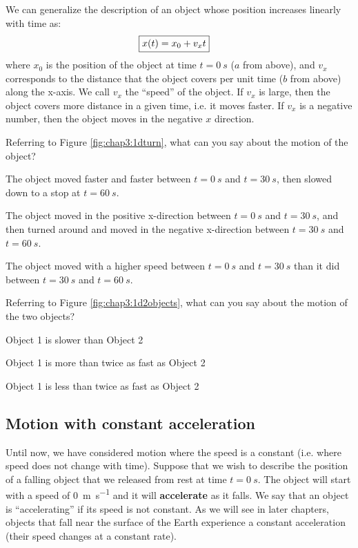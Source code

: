 We can generalize the description of an object whose position increases linearly with time as:
\begin{align}
\label{eqn:chap3:1dxvst_noa}
\Aboxed{x(t) = x_0 + v_xt}
\end{align}
where $x_0$ is the position of the object at time $t=\SI{0}{s}$ ($a$ from above), and $v_x$ corresponds to the distance that the object covers per unit time ($b$ from above) along the x-axis. We call $v_x$ the ``speed'' of the object. If $v_x$ is large, then the object covers more distance in a given time, i.e. it moves faster. If $v_x$ is a negative number, then the object moves in the negative $x$ direction.

\begin{checkpointMC}{Referring to Figure \ref{fig:chap3:1dturn}, what can you say about the motion of the object? }
\item The object moved faster and faster between $t=\SI{0}{s}$ and $t=\SI{30}{s}$, then slowed down to a stop at $t=\SI{60}{s}$.
\item The object moved in the positive x-direction between $t=\SI{0}{s}$ and $t=\SI{30}{s}$, and then turned around and moved in the negative x-direction between $t=\SI{30}{s}$ and $t=\SI{60}{s}$. %
\item The object moved with a higher speed between $t=\SI{0}{s}$ and $t=\SI{30}{s}$ than it did between $t=\SI{30}{s}$ and $t=\SI{60}{s}$.
\end{checkpointMC}

\begin{checkpointMC}{Referring to Figure \ref{fig:chap3:1d2objects}, what can you say about the motion of the two objects? }
\item Object 1 is slower than Object 2
\item Object 1 is more than twice as fast as Object 2 %
\item Object 1 is less than twice as fast as Object 2
\end{checkpointMC}

\subsection{Motion with constant acceleration}
Until now, we have considered motion where the speed is a constant (i.e. where speed does not change with time). Suppose that we wish to describe the position of a falling object that we released from rest at time $t=\SI{0}{s}$. The object will start with a speed of \SI{0}{m\per s} and it will \textbf{accelerate} as it falls. We say that an object is ``accelerating'' if its speed is not constant. As we will see in later chapters, objects that fall near the surface of the Earth experience a constant acceleration (their speed changes at a constant rate).

